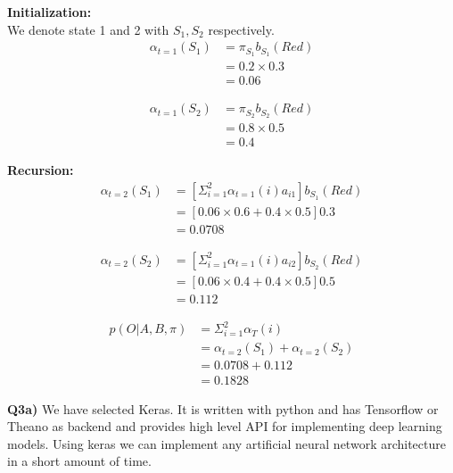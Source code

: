 \documentclass[12pt]{article}
\begin{document}
\textbf{Initialization:}\\
We denote state 1 and 2 with $S_1, S_2$ respectively.
\begin{equation}
	\begin{aligned}
		\alpha_{t=1}(S_1) &= \pi_{S_1}b_{S_1}(Red)\\
						&= 0.2 \times 0.3\\
						&=0.06
	\end{aligned}
\end{equation}

\begin{equation}
	\begin{aligned}
		\alpha_{t=1}(S_2) &= \pi_{S_2}b_{S_2}(Red)\\
		&= 0.8 \times 0.5\\
		&=0.4
	\end{aligned}
\end{equation}

\textbf{Recursion:}\\
\begin{equation}
	\begin{aligned}
		\alpha_{t=2}(S_1) &= [ \Sigma_{i=1}^2 \alpha_{t=1}(i)a_{i1}]b_{S_1}(Red)\\
		&= [0.06 \times 0.6 + 0.4 \times 0.5]0.3\\
		&= 0.0708
	\end{aligned}
\end{equation}

\begin{equation}
	\begin{aligned}
		\alpha_{t=2}(S_2) &= [ \Sigma_{i=1}^2 \alpha_{t=1}(i)a_{i2}]b_{S_2}(Red)\\
		&= [0.06 \times 0.4 + 0.4 \times 0.5]0.5\\
		&= 0.112
	\end{aligned}
\end{equation}

\begin{equation}
	\begin{aligned}
		p(O | A, B, \pi) &= \Sigma_{i=1}^2 \alpha_T(i)\\
		&=\alpha_{t=2}(S_1) + \alpha_{t=2}(S_2)\\
		&= 0.0708 + 0.112\\
		&= 0.1828
	\end{aligned}
\end{equation}

\textbf{Q3a)} We have selected Keras. It is written with python and has Tensorflow or Theano as backend and provides high level API for implementing deep learning models. Using keras we can implement any artificial neural network architecture in a short amount of time.\\
\end{document}
